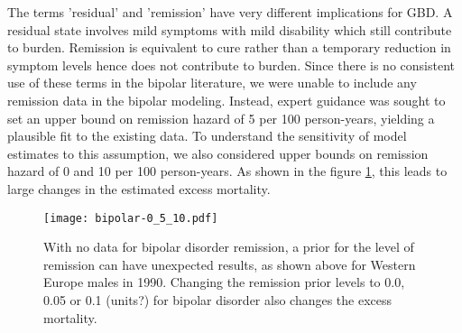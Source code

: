 The terms 'residual' and 'remission' have very different implications for GBD.  A residual state involves mild symptoms with mild disability which still contribute to burden. Remission is equivalent to cure rather than a temporary reduction in symptom levels hence does not contribute to burden. Since there is no consistent use of these terms in the bipolar literature, we were unable to include any remission data in the bipolar modeling. Instead, expert guidance was sought to set an upper bound on remission hazard of 5 per 100 person-years, yielding a plausible fit to the existing data. To understand the sensitivity of model estimates to this assumption, we also considered upper bounds on remission hazard of 0 and 10 per 100 person-years.  As shown in the figure \ref{fig:app-bipolar remission}, this leads to large changes in the estimated excess mortality.

    \begin{figure}[h]
        \begin{center}
            \texttt{[image: bipolar-0\_5\_10.pdf]}
            \caption{With no data for bipolar disorder remission, a prior for the level of remission can have unexpected results, as shown above for Western Europe males in 1990.  Changing the remission prior levels to 0.0, 0.05 or 0.1 (units?) for bipolar disorder also changes the excess mortality.}
            \label{fig:app-bipolar remission}
        \end{center}
    \end{figure}

 